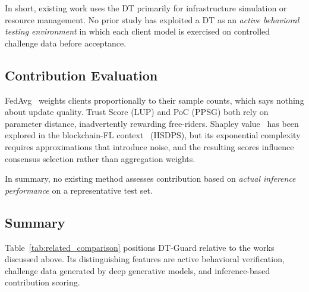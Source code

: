 \documentclass[conference]{IEEEtran}
\begin{document}
    In short, existing work uses the DT primarily for infrastructure simulation or resource management. No prior study has exploited a DT as an \emph{active behavioral testing environment} in which each client model is exercised on controlled challenge data before acceptance.
    
    \subsection{Contribution Evaluation}
    
    FedAvg~\cite{mcmahan2016communication} weights clients proportionally to their sample counts, which says nothing about update quality. Trust Score (LUP) and PoC (PPSG) both rely on parameter distance, inadvertently rewarding free-riders. Shapley value~\cite{shapley1953value} has been explored in the blockchain-FL context~\cite{zhang2025bcsm} (HSDPS), but its exponential complexity requires approximations that introduce noise, and the resulting scores influence consensus selection rather than aggregation weights.
    
    In summary, no existing method assesses contribution based on \emph{actual inference performance} on a representative test set.
    
    \subsection{Summary}
    
    Table~\ref{tab:related_comparison} positions DT-Guard relative to the works discussed above. Its distinguishing features are active behavioral verification, challenge data generated by deep generative models, and inference-based contribution scoring.
    
\end{document}

